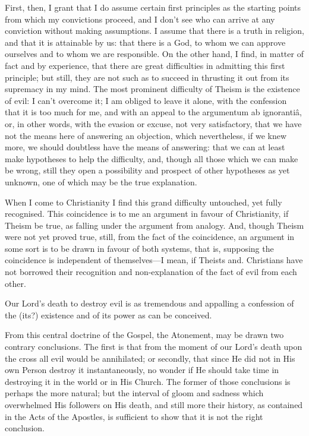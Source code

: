 First, then, I grant that I do assume certain
first principles as the starting points from which my convictions
proceed, and I don't see who can arrive at any conviction without
making assumptions. I assume that there is a truth in religion, and
that it is attainable by us: that there is a God, to whom we can
approve ourselves and to whom we are responsible. On the other hand, I
find, in matter of fact and by experience, that there are great
difficulties in admitting this first principle; but still, they are
not such as to succeed in thrusting it out from its supremacy in my
mind. The most prominent difficulty of Theism is the existence of
evil: I can't overcome it; I am obliged to leave it alone, with the
confession that it is too much for me, and with an appeal to the
argumentum ab ignorantiâ, or, in other words, with the evasion or
excuse, not very satisfactory, that we have not the means here of
answering an objection, which nevertheless, if we knew more, we should
doubtless have the means of answering: that we can at least make
hypotheses to help the difficulty, and, though all those which
we can make be wrong, still they open a possibility and prospect of
other hypotheses as yet unknown, one of which may be the true
explanation.

When I come to Christianity I find this grand
difficulty untouched, yet fully recognised. This coincidence is to me
an argument in favour of Christianity, if Theism be true, as falling
under the argument from analogy. And, though Theism were not yet
proved true, still, from the fact of the coincidence, an argument in
some sort is to be drawn in favour of both systems, that is, supposing
the coincidence is independent of themselves—I mean, if Theists and.
Christians have not borrowed their recognition and non-explanation of
the fact of evil from each other.

Our Lord's death to destroy evil is as tremendous
and appalling a confession of the (its?) existence and of its power as
can be conceived.

From this central doctrine of the Gospel, the
Atonement, may be drawn two contrary conclusions. The first is that
from the moment of our Lord's death upon the cross all evil would be
annihilated; or secondly, that since He did not in His own Person
destroy it instantaneously, no wonder if He should take time in
destroying it in the world or in His Church. The former of those
conclusions is perhaps the more natural; but the interval of gloom and
sadness which overwhelmed His followers on His death, and still more
their history, as contained in the Acts of the Apostles, is sufficient
to show that it is not the right conclusion.

